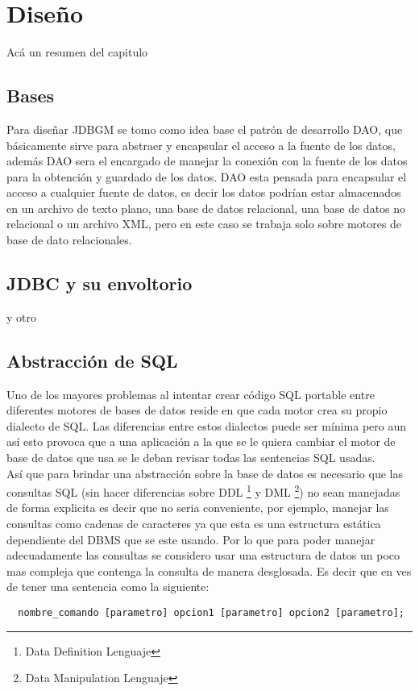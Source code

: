 \chapter{Diseño}
Acá un resumen del capitulo
\section{Bases}
Para diseñar JDBGM se tomo como idea base el patrón de desarrollo DAO, que básicamente sirve para abstraer y encapsular el acceso a la fuente de los datos, además DAO sera el encargado de manejar la conexión con la fuente de los datos para la obtención y guardado de los datos.
DAO esta pensada para encapsular el acceso a cualquier fuente de datos, es decir los datos podrían estar almacenados en un archivo de texto plano, una base de datos relacional, una base de datos no relacional o un archivo XML, pero en este caso se trabaja solo sobre motores de base de dato relacionales.  


\section{JDBC y su envoltorio}
y otro


\section{Abstracción de SQL}
Uno de los mayores problemas al intentar crear código SQL portable entre diferentes motores de bases de datos reside en que cada motor crea su propio dialecto de SQL. Las diferencias entre estos dialectos puede ser mínima pero aun así esto provoca que a una aplicación a la que se le quiera cambiar el motor de base de datos que usa se le deban revisar todas las sentencias SQL usadas.\\
Así que para brindar una abstracción sobre la base de datos es necesario que las consultas SQL (sin hacer diferencias sobre DDL \footnote{Data Definition Lenguaje} y DML \footnote{Data Manipulation Lenguaje}) no sean manejadas de forma explicita es decir que no seria conveniente, por ejemplo, manejar las consultas como cadenas de caracteres ya que esta es una estructura estática dependiente del DBMS que se este usando. Por lo que para poder manejar adecuadamente las consultas se considero usar una estructura de datos un poco mas compleja que contenga la consulta de manera desglosada. Es decir que en ves de tener una sentencia como la siguiente:
\begin{Verbatim}
  nombre_comando [parametro] opcion1 [parametro] opcion2 [parametro]; 
\end{Verbatim}

